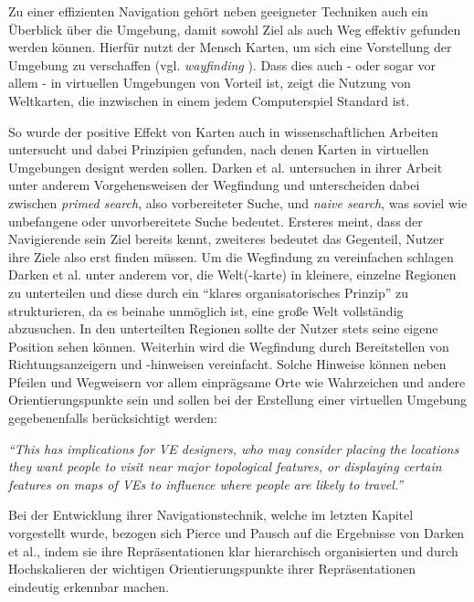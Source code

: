 Zu einer effizienten Navigation gehört neben geeigneter Techniken auch ein Überblick über die Umgebung, damit sowohl Ziel als auch Weg effektiv gefunden werden können.
Hierfür nutzt der Mensch Karten, um sich eine Vorstellung der Umgebung zu verschaffen (vgl. \textit{wayfinding} \cite{Bowman2001AnDesign}). Dass dies auch - oder sogar vor allem - in virtuellen Umgebungen von Vorteil ist, zeigt die Nutzung von Weltkarten, die inzwischen in einem jedem Computerspiel Standard ist. 

So wurde der positive Effekt von Karten auch in wissenschaftlichen Arbeiten untersucht und dabei Prinzipien gefunden, nach denen Karten in virtuellen Umgebungen designt werden sollen.
Darken et al. \cite{12_Darken1996_WayfindingStrategies} untersuchen in ihrer Arbeit unter anderem Vorgehensweisen der Wegfindung und unterscheiden dabei zwischen \textit{primed search}, also vorbereiteter Suche, und \textit{naive search}, was soviel wie unbefangene oder unvorbereitete Suche bedeutet.
Ersteres meint, dass der Navigierende sein Ziel bereits kennt, zweiteres bedeutet das Gegenteil, Nutzer ihre Ziele also erst finden müssen.
Um die Wegfindung zu vereinfachen schlagen Darken et al. unter anderem vor, die Welt(-karte) in kleinere, einzelne Regionen zu unterteilen und diese durch ein “klares organisatorisches Prinzip” zu strukturieren, da es beinahe unmöglich ist, eine große Welt vollständig abzusuchen. In den unterteilten Regionen sollte der Nutzer stets seine eigene Position sehen können. 
Weiterhin wird die Wegfindung durch Bereitstellen von Richtungsanzeigern und -hinweisen vereinfacht. Solche Hinweise können neben Pfeilen und Wegweisern vor allem einprägsame Orte wie Wahrzeichen und andere Orientierungspunkte sein und sollen bei der Erstellung einer virtuellen Umgebung gegebenenfalls berücksichtigt werden:

\begin{addmargin}[25pt]{0pt} 

\textit{“This has implications for VE designers, who may consider placing the locations they want
people to visit near major topological features, or displaying certain features on maps of
VEs to influence where people are likely to travel.”} \cite{12_Darken1996_WayfindingStrategies}

\end{addmargin}

Bei der Entwicklung ihrer Navigationstechnik, welche im letzten Kapitel vorgestellt wurde, bezogen sich Pierce und Pausch \cite{pierce_representations} auf die Ergebnisse von Darken et al., indem sie ihre Repräsentationen klar hierarchisch organisierten und durch Hochskalieren der wichtigen Orientierungspunkte ihrer Repräsentationen eindeutig erkennbar machen.

